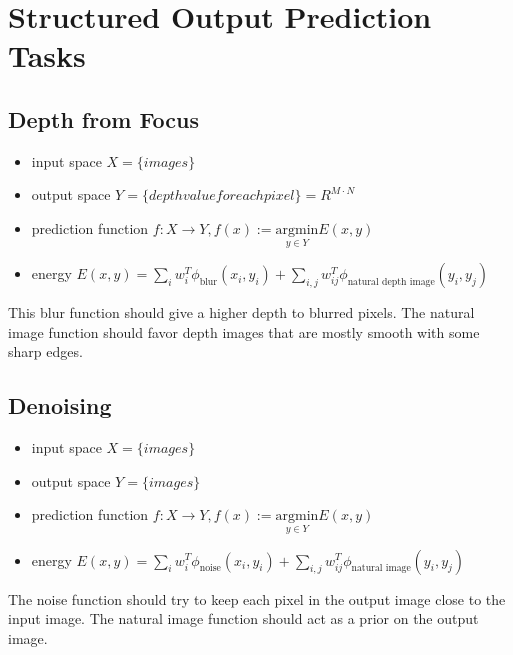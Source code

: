 
\section*{Structured Output Prediction Tasks}

\subsection*{Depth from Focus}
\begin{itemize}
    \item input space $X = \{images \}$
    \item output space $Y = \{depth value for each pixel\} = R^{M\cdot N}$
    \item prediction function $f : X \rightarrow Y, f(x):= \underset{y \in Y}{\text{argmin}} E(x,y)$
    \item energy $E(x,y) = \sum_i w^T_i \phi_{\text{blur}}(x_i, y_i) + \sum_{i,j} w^T_{ij} \phi_{\text{natural depth image}}(y_i, y_j)$
\end{itemize}

This blur function should give a higher depth to blurred pixels. The natural image function should favor depth images that are mostly smooth with some sharp edges.

\subsection*{Denoising} 

\begin{itemize}
    \item input space $X = \{images \}$
    \item output space $Y = \{images \}$
    \item prediction function $f : X \rightarrow Y, f(x):= \underset{y \in Y}{\text{argmin}} E(x,y)$
    \item energy $E(x,y) = \sum_i w^T_i \phi_{\text{noise}}(x_i, y_i) + \sum_{i,j} w^T_{ij} \phi_{\text{natural image}}(y_i, y_j)$
\end{itemize}

The noise function should try to keep each pixel in the output image close to the input image. The natural image function should act as a prior on the output image.

